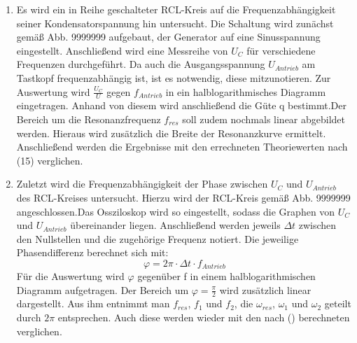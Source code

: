 \begin{enumerate}
      \item Es wird ein in Reihe geschalteter RCL-Kreis auf die Frequenzabhängigkeit seiner Kondensatorspannung hin untersucht.
      Die Schaltung wird zunächst gemäß Abb. 9999999 aufgebaut, der Generator auf eine Sinusspannung eingestellt.
      Anschließend wird eine Messreihe von $U_C$ für verschiedene Frequenzen durchgeführt.
       Da auch die Ausgangsspannung $U_{Antrieb}$ am Tastkopf frequenzabhängig ist, ist es notwendig, diese mitzunotieren.
       Zur Auswertung wird $\frac{U_C}{U}$ gegen $f_{Antrieb}$ in ein halblogarithmisches Diagramm eingetragen. Anhand von diesem wird
        anschließend die Güte q bestimmt.Der Bereich um die Resonanzfrequenz $f_{res}$ soll zudem nochmals linear
         abgebildet werden. Hieraus wird zusätzlich die Breite der Resonanzkurve ermittelt.
         Anschließend werden die Ergebnisse mit den errechneten Theoriewerten nach (15) verglichen.

         \item Zuletzt wird die Frequenzabhängigkeit der Phase zwischen $U_C$ und $U_{Antrieb}$ des
          RCL-Kreises untersucht. Hierzu wird der RCL-Kreis gemäß Abb. 9999999
          angeschlossen.Das Ossziloskop wird so eingestellt, sodass die Graphen von $U_C$ und $U_{Antrieb}$ übereinander liegen.
             Anschließend werden jeweils
      $\Delta t$ zwischen den Nullstellen und die zugehörige Frequenz notiert. Die jeweilige
       Phasendifferenz berechnet sich mit:
       \begin{equation}
         \varphi = 2 \pi \cdot \Delta t \cdot f_{Antrieb}
       \end{equation}
       Für die Auswertung wird $\varphi$ gegenüber f in einem halblogarithmischen
        Diagramm aufgetragen. Der Bereich um $\varphi = \frac{\pi}{2}$ wird zusätzlich
         linear dargestellt. Aus ihm entnimmt man $f_{res}$, $f_1$ und $f_2$,
          die $\omega_{res}$, $\omega_1$ und $\omega_2$ geteilt durch $2\pi$ entsprechen.
           Auch diese werden wieder
         mit den nach () berechneten verglichen.
\end{enumerate}
